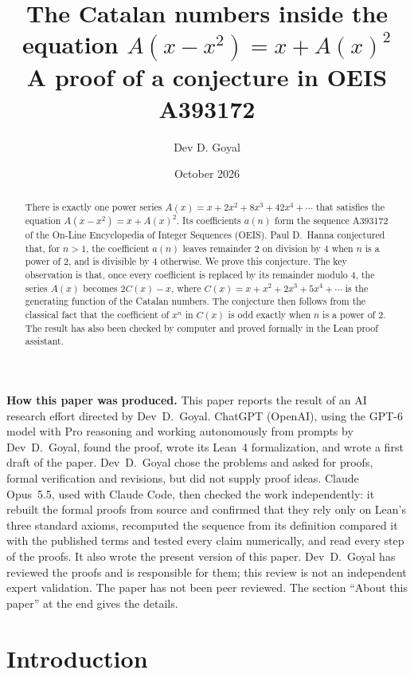 \documentclass[11pt,a4paper]{article}
\title{The Catalan numbers inside the equation $A(x-x^2)=x+A(x)^2$\\[6pt]\large A proof of a conjecture in OEIS A393172}
\author{Dev D. Goyal}
\date{October 2026}
\theoremstyle{definition}
\theoremstyle{remark}
\begin{document}
\maketitle
\begin{abstract}
There is exactly one power series $A(x)=x+2x^2+8x^3+42x^4+\cdots$ that satisfies the equation $A(x-x^2)=x+A(x)^2$.
Its coefficients $a(n)$ form the sequence A393172 of the On-Line Encyclopedia of Integer Sequences (OEIS).
Paul D.~Hanna conjectured that, for $n>1$, the coefficient $a(n)$ leaves remainder $2$ on division by $4$ when $n$ is a
power of $2$, and is divisible by $4$ otherwise. We prove this conjecture. The key observation is that, once every
coefficient is replaced by its remainder modulo $4$, the series $A(x)$ becomes $2C(x)-x$, where
$C(x)=x+x^2+2x^3+5x^4+\cdots$ is the generating function of the Catalan numbers. The conjecture then follows from the
classical fact that the coefficient of $x^n$ in $C(x)$ is odd exactly when $n$ is a power of $2$. The result has also been checked
by computer and proved formally in the Lean proof assistant.
\end{abstract}
\begin{center}\begin{minipage}{0.88\linewidth}\small
\textbf{How this paper was produced.} This paper reports the result of an AI research effort directed by
Dev~D.~Goyal. ChatGPT (OpenAI), using the GPT-6 model with Pro reasoning and working autonomously from prompts by
Dev~D.~Goyal, found the proof, wrote its Lean~4 formalization, and wrote a first draft of the paper.
Dev~D.~Goyal chose the problems and asked for proofs, formal verification and revisions, but did not supply proof
ideas. Claude Opus~5.5, used with Claude Code, then checked the work independently: it rebuilt the formal proofs from
source and confirmed that they rely only on Lean's three standard axioms, recomputed the sequence from its definition
compared it with the published terms and tested every claim numerically, and read every step of the proofs. It also wrote the present
version of this paper.
Dev~D.~Goyal has reviewed the proofs and is responsible for them; this review is not an independent expert validation.
The paper has not been peer reviewed.
The section ``About this paper'' at the end gives the details.
\end{minipage}\end{center}

\section{Introduction}
\end{document}
